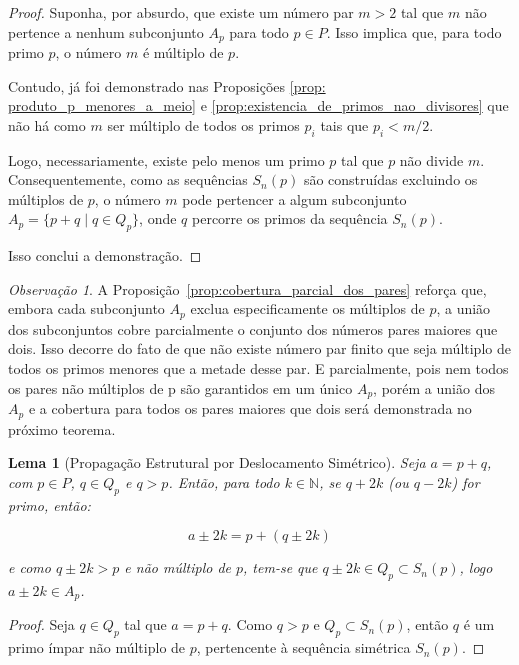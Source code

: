 \documentclass[a4paper,11pt]{article}
\newtheorem{lemma}[theorem]{Lema}
\theoremstyle{definition}
\theoremstyle{remark}
\newtheorem{remark}[theorem]{Observação}
\begin{document}
\begin{otherlanguage}{brazil}
	\begin{proof}
		Suponha, por absurdo, que existe um número par \(m > 2\) tal que \(m\) não pertence a nenhum subconjunto \(A_p\) para todo \(p \in P\). Isso implica que, para todo primo \(p\), o número \(m\) é múltiplo de \(p\).
		
		Contudo, já foi demonstrado nas Proposições \ref{prop: produto_p_menores_a_meio} e \ref{prop:existencia_de_primos_nao_divisores} que não há como \(m\) ser múltiplo de todos os primos \( p_i \) tais que \( p_i < m/2 \). 
		
		Logo, necessariamente, existe pelo menos um primo \(p\) tal que \(p\) não divide \(m\). Consequentemente, como as sequências \(S_n(p)\) são construídas excluindo os múltiplos de \(p\), o número \(m\) pode pertencer a algum subconjunto \(A_p = \{p + q \mid q \in Q_p\}\), onde \(q\) percorre os primos da sequência \(S_n(p)\).
		
		Isso conclui a demonstração.
	\end{proof}
	\begin{remark}
		A Proposição~\ref{prop:cobertura_parcial_dos_pares} reforça que, embora cada subconjunto \(A_p\) exclua especificamente os múltiplos de \(p\), a união dos subconjuntos cobre parcialmente o conjunto dos números pares maiores que dois. Isso decorre do fato de que não existe número par finito que seja múltiplo de todos os primos menores que a metade desse par. E parcialmente, pois nem todos os pares não múltiplos de p são garantidos em um único \(A_p\), porém a união dos \(A_p\) e a cobertura para todos os pares maiores que dois será demonstrada no próximo teorema.
	\end{remark}
	
	\begin{lemma}[Propagação Estrutural por Deslocamento Simétrico]
		Seja \(a = p + q\), com \(p \in P\), \(q \in Q_p\) e \(q > p\). Então, para todo \(k \in \mathbb{N}\), se \(q + 2k\) (ou \(q - 2k\)) for primo, então:
		
		\[
		a \pm 2k = p + (q \pm 2k)
		\]
		
		e como \(q \pm 2k > p\) e não múltiplo de \(p\), tem-se que \(q \pm 2k \in Q_p \subset S_n(p)\), logo \(a \pm 2k \in A_p\).
	\end{lemma}
	
	\begin{proof}
		Seja \(q \in Q_p\) tal que \(a = p + q\). Como \(q > p\) e \(Q_p \subset S_n(p)\), então \(q\) é um primo ímpar não múltiplo de \(p\), pertencente à sequência simétrica \(S_n(p)\).
		

\end{proof}
\end{otherlanguage}
\end{document}
